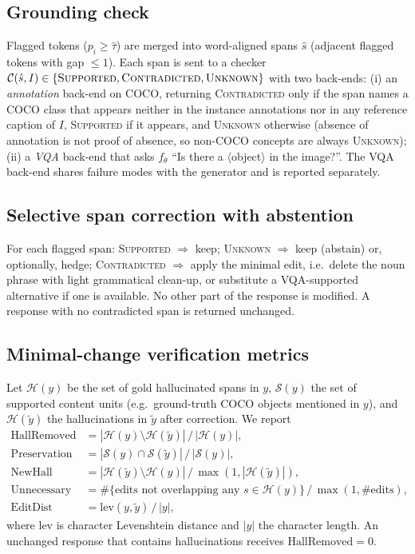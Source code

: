 \documentclass[11pt]{article}
\begin{document}
\subsection{Grounding check}
Flagged tokens ($p_i \ge \hat\tau$) are merged into word-aligned spans $\hat s$ (adjacent flagged tokens with gap $\le 1$). Each span is sent to a checker $\mathcal C(\hat s, I) \in \{\textsc{Supported}, \textsc{Contradicted}, \textsc{Unknown}\}$ with two back-ends:
(i) an \emph{annotation} back-end on COCO, returning \textsc{Contradicted} only if the span names a COCO class that appears neither in the instance annotations nor in any reference caption of $I$, \textsc{Supported} if it appears, and \textsc{Unknown} otherwise (absence of annotation is not proof of absence, so non-COCO concepts are always \textsc{Unknown});
(ii) a \emph{VQA} back-end that asks $f_\theta$ ``Is there a $\langle$object$\rangle$ in the image?''. The VQA back-end shares failure modes with the generator and is reported separately.

\subsection{Selective span correction with abstention}
For each flagged span: \textsc{Supported} $\Rightarrow$ keep; \textsc{Unknown} $\Rightarrow$ keep (abstain) or, optionally, hedge; \textsc{Contradicted} $\Rightarrow$ apply the minimal edit, i.e.\ delete the noun phrase with light grammatical clean-up, or substitute a VQA-supported alternative if one is available. No other part of the response is modified. A response with no contradicted span is returned unchanged.

\subsection{Minimal-change verification metrics}
Let $\mathcal H(y)$ be the set of gold hallucinated spans in $y$, $\mathcal S(y)$ the set of supported content units (e.g.\ ground-truth COCO objects mentioned in $y$), and $\mathcal H(\tilde y)$ the hallucinations in $\tilde y$ after correction. We report
\begin{align}
\text{HallRemoved} &= |\mathcal H(y)\setminus \mathcal H(\tilde y)| \,/\, |\mathcal H(y)|,\\
\text{Preservation} &= |\mathcal S(y)\cap \mathcal S(\tilde y)| \,/\, |\mathcal S(y)|,\\
\text{NewHall} &= |\mathcal H(\tilde y)\setminus \mathcal H(y)| \,/\, \max(1,|\mathcal H(\tilde y)|),\\
\text{Unnecessary} &= \#\{\text{edits not overlapping any } s\in\mathcal H(y)\} \,/\, \max(1,\#\text{edits}),\\
\text{EditDist} &= \mathrm{lev}(y,\tilde y)\,/\,|y|,
\end{align}
where $\mathrm{lev}$ is character Levenshtein distance and $|y|$ the character length. An unchanged response that contains hallucinations receives $\text{HallRemoved}=0$.
\end{document}
